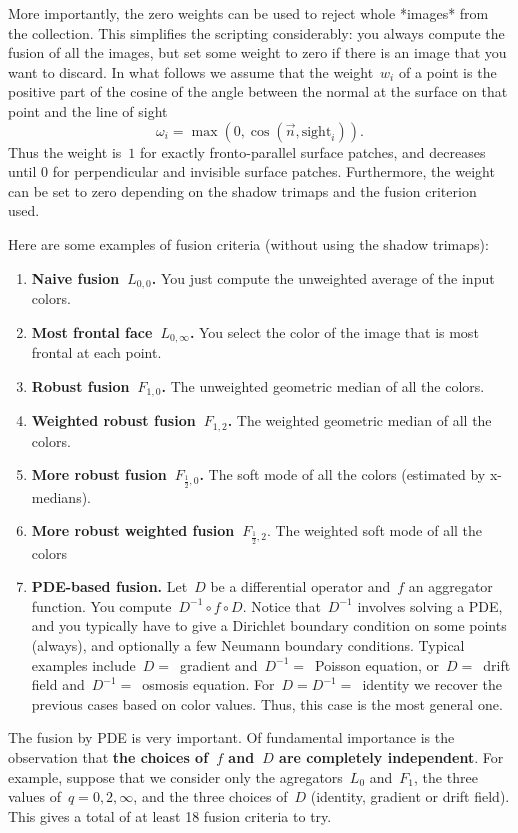 \documentclass{article}
\begin{document}
More importantly, the zero weights can be used to reject whole *images* from the
collection.  This simplifies the scripting considerably: you always compute
the fusion of all the images, but set some weight to zero if there is an
image that you want to discard.  In what follows we assume that the
weight~$w_i$ of a point is the positive part of the cosine of the angle between the normal at the
surface on that point and the line of sight
\[
	\omega_i = \max\left(0,\cos\left(\vec n,
	\mathrm{sight}_i\right)\right).
\]
Thus the weight is~$1$ for exactly fronto-parallel surface patches, and
decreases until 0 for perpendicular and invisible surface patches.
Furthermore, the weight can be set to zero depending on the shadow trimaps
and the fusion criterion used.

Here are some examples of fusion criteria (without using the shadow trimaps):

\begin{enumerate}
	\item {\bf Naive fusion~$L_{0,0}$.}  You just compute the unweighted
		average of the input colors.
	\item {\bf Most frontal face~$L_{0,\infty}$.}  You select the color
		of the image that is most frontal at each point.
	\item {\bf Robust fusion~$F_{1,0}$.}  The unweighted geometric median
		of all the colors.
	\item {\bf Weighted robust fusion~$F_{1,2}$.}  The weighted geometric
		median of all the colors.
	\item {\bf More robust fusion~$F_{\tfrac12,0}$.}  The soft mode of all
		the colors (estimated by x-medians).
	\item {\bf More robust weighted fusion~$F_{\tfrac12,2}.$}  The
		weighted soft mode of all the colors
	\item {\bf PDE-based fusion.}  Let~$D$ be a differential operator
		and~$f$ an aggregator function.  You compute~$D^{-1}\circ
		f\circ D$.  Notice that~$D^{-1}$ involves solving a PDE, and
		you typically have to give a Dirichlet boundary condition on
		some points (always), and optionally a few Neumann boundary
		conditions.  Typical examples include~$D=$~gradient
		and~$D^{-1}=$~Poisson equation, or~$D=$~drift field
		and~$D^{-1}=$~osmosis equation.  For~$D=D^{-1}=$~identity we
		recover the previous cases based on color values.
		Thus, this case is the most general one.
\end{enumerate}

The fusion by PDE is very important.  Of fundamental importance is the
observation that {\bf the choices of~$f$ and~$D$ are completely independent}.
For example, suppose that we consider only the agregators~$L_0$ and~$F_1$,
the three values of~$q=0,2,\infty$, and the three choices of~$D$ (identity,
gradient or drift field).  This gives a total of at least 18 fusion criteria
to try.
\end{document}
